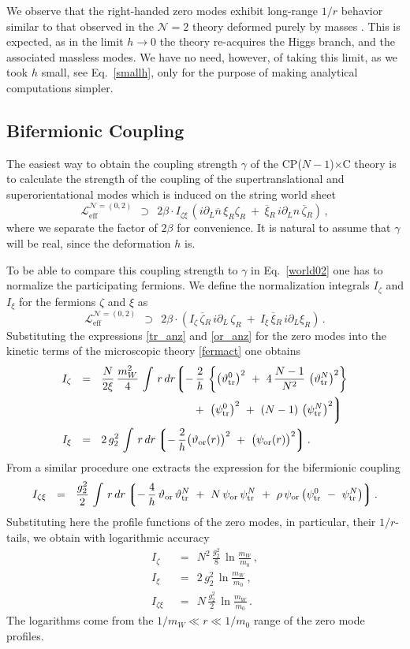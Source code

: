 \documentclass[12pt]{article}
\def\beq{\begin{equation}}
\def\eeq{\end{equation}}
\newcommand{\ntwo}{${\mathcal N}=2$ }
\newcommand{\p}{\partial}
\newcommand{\ov}{\overline}
\newcommand{\mc}[1]{\mathcal{#1}}
\newcommand{\lgr}{\left\lgroup}
\newcommand{\rgr}{\right\rgroup}
\newcommand{\bxir}{\ov{\xi}{}_R}
\newcommand{\xir}{\xi_R}
\newcommand{\bzr}{\ov{\zeta}{}_R}
\newcommand{\zr}{\zeta_R}
\newcommand{\nbar}{\ov{n}}
\newcommand{\pts}{\psi_{\rm tr}^0}
\newcommand{\ptN}{\psi_{\rm tr}^N}
\newcommand{\tts}{\vartheta_{\rm tr}^0}
\newcommand{\ttN}{\vartheta_{\rm tr}^N}
\newcommand{\tor}{\vartheta_{\rm or}}
\newcommand{\por}{\psi_{\rm or}}
\newcommand{\CPC}{CP($N-1$)$\times$C }
\begin{document}
We observe that the right-handed zero modes exhibit long-range $1/r$ behavior similar to that observed
in the \ntwo theory deformed purely by masses \cite{GSYmmodel,SYhet}. 
This is expected, as in the limit $ h \to 0 $ the theory re-acquires the Higgs branch, and the associated
massless modes. 
We have no need, however, of taking this limit, as we took $ h $ small, 
see Eq.~\eqref{smallh}, only for the purpose of making analytical computations simpler.

\subsection{Bifermionic Coupling}

The easiest way to obtain the coupling strength $ \gamma $ of the \CPC theory
is to calculate the strength of the coupling of the supertranslational and superorientational
modes which is induced on the string world sheet
\beq
\label{bif_norm}
	\mc{L}_\text{eff}^{\mc{N}=(0,2)} ~~\supset~~
	2\beta \cdot I_{\zeta\xi}\, ( i\p_L\nbar\,\xir\zr ~+~ \bxir\,i\p_L n\, \bzr )\,,
\eeq
where we separate the factor of $ 2\beta $ for convenience. 
It is natural to assume that $ \gamma $ will be real, since the deformation $h$ is.

To be able to compare this coupling strength to $ \gamma $ in Eq.~\eqref{world02} one has to normalize 
the participating fermions.
We define the normalization integrals $ I_\zeta $ and $ I_\xi $ for the fermions $ \zeta $ and $ \xi $ as
\beq
\label{kin_norm}
	\mc{L}_\text{eff}^{\mc{N}=(0,2)} ~~\supset~~
	2\beta \cdot ( I_\zeta\, \bzr\, i\p_L\,\zr  ~+~ I_\xi\, \bxir\, i\p_L \xir ) \,.
\eeq
Substituting the expressions \eqref{tr_anz} and \eqref{or_anz} for the zero modes into the kinetic terms
of the microscopic theory \eqref{fermact} one obtains
\begin{align*}
%
	I_\zeta & ~~=~~ \frac{N}{2\xi}\, \frac{m_W^2}{4}\, \int\, r\,dr 
		\biggl\lgroup -\, \frac{2}{h}\, 
			  \left\{ \left( \tts \right)^2 
				~+~ 4\,\frac{N-1}{N^2}\, \left( \ttN \right)^2 \right\} \\
		& \qquad\qquad\qquad\qquad\qquad~~
			~+~ \left( \pts \right)^2 ~+~ (N-1)\,\left( \ptN \right)^2  \biggr\rgroup \\
%
	I_\xi & ~~=~~ 2\,g_2^2\, \int\, r\,dr 
		\lgr -\,\frac{2}{h}\bigl( \tor(r) \bigr)^2 ~+~ \bigl( \por(r) \bigr)^2 \rgr.
\end{align*}
From a similar procedure one extracts the expression for the bifermionic coupling
\[
	I_{\zeta\xi} ~~=~~ \frac{g_2^2}{2}\, \int\, r\,dr
		\lgr -\,\frac{4}{h}\,\tor\,\ttN  ~+~ N\, \por\,\ptN  
			~+~ \rho\, \por \left( \pts ~-~ \ptN \right) \rgr.
\]
Substituting here the profile functions of the zero modes, in particular, their $ 1/r $-tails,
we obtain with logarithmic accuracy
\begin{align*}
%
	I_\zeta & ~~=~~ N^2\,\frac{g_2^2}{8}\, \ln \frac{m_W}{m_0}\,, \\
%
	I_\xi   & ~~=~~ 2\,g_2^2\, \ln \frac{m_W}{m_0}\,, \\
%
	I_{\zeta\xi} & ~~=~~ N\, \frac{g_2^2}{2}\,  \ln \frac{m_W}{m_0}\,.
\end{align*}
The logarithms come from the $ 1/m_W \ll r \ll 1/m_0 $ range of the zero mode profiles.
\end{document}
